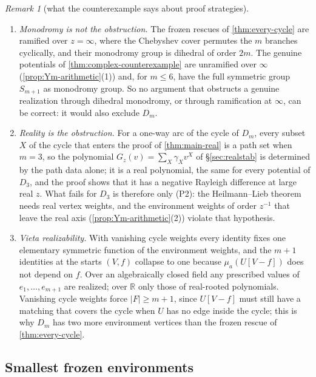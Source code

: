 \documentclass[11pt]{amsart}
\theoremstyle{plain}
\theoremstyle{definition}
\theoremstyle{remark}
\newtheorem{remark}[theorem]{Remark}
\numberwithin{equation}{section}
\newcommand{\RR}{\mathbb{R}}
\begin{document}
\begin{remark}[what the counterexample says about proof strategies]\label{rem:monodromy}
\begin{enumerate}[label=(\arabic*)]
\item \emph{Monodromy is not the obstruction.} The frozen rescues of \cref{thm:every-cycle} are ramified over $z=\infty$, where the Chebyshev cover permutes the $m$ branches cyclically, and their monodromy group is dihedral of order $2m$. The genuine potentials of \cref{thm:complex-counterexample} are unramified over $\infty$ (\cref{prop:Ym-arithmetic}(1)) and, for $m\le6$, have the full symmetric group $S_{m+1}$ as monodromy group. So no argument that obstructs a genuine realization through dihedral monodromy, or through ramification at $\infty$, can be correct: it would also exclude $D_m$.
\item \emph{Reality is the obstruction.} For a one-way arc of the cycle of $D_m$, every subset $X$ of the cycle that enters the proof of \cref{thm:main-real} is a path set when $m=3$, so the polynomial $G_z(v)=\sum_X\gamma_Xv^{X}$ of \S\ref{sec:realstab} is determined by the path data alone; it is a real polynomial, the same for every potential of $D_3$, and the proof shows that it has a negative Rayleigh difference at large real $z$. What fails for $D_3$ is therefore only \textup{(P2)}: the Heilmann--Lieb theorem needs real vertex weights, and the environment weights of order $z^{-1}$ that leave the real axis (\cref{prop:Ym-arithmetic}(2)) violate that hypothesis.
\item \emph{Vieta realizability.} With vanishing cycle weights every identity fixes one elementary symmetric function of the environment weights, and the $m+1$ identities at the starts $(V,f)$ collapse to one because $\mu_a(U[V-f])$ does not depend on $f$. Over an algebraically closed field any prescribed values of $e_1,\dots,e_{m+1}$ are realized; over $\RR$ only those of real-rooted polynomials. Vanishing cycle weights force $|F|\ge m+1$, since $U[V-f]$ must still have a matching that covers the cycle when $U$ has no edge inside the cycle; this is why $D_m$ has two more environment vertices than the frozen rescue of \cref{thm:every-cycle}.
\end{enumerate}
\end{remark}

\subsection{Smallest frozen environments}
\end{document}
